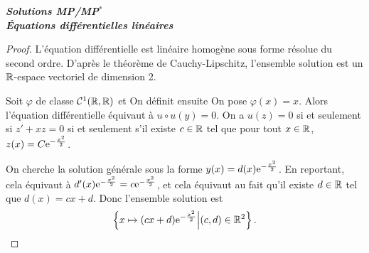 \documentclass[12pt]{article}
\begin{document}
\begin{titlepage}
	\centering
	\vspace*{\fill}
	\Huge \textit{\textbf{Solutions MP/MP$^*$\\ Équations différentielles linéaires}}
	\vspace*{\fill}
\end{titlepage}

\begin{proof}

	L'équation différentielle est linéaire homogène sous forme résolue du second ordre. D'après le théorème de Cauchy-Lipschitz, l'ensemble solution est un $\mathbb{R}$-espace vectoriel de dimension 2.

	Soit $\varphi$ de classe $\mathcal{C}^{1}(\mathbb{R},\mathbb{R})$ et 
	On définit ensuite 
	On pose $\varphi(x)=x$. Alors l'équation différentielle équivaut à $u\circ u(y)=0$. On a $u(z)=0$ si et seulement si $z'+xz=0$ si et seulement s'il existe $c\in\mathbb{R}$ tel que pour tout $x\in\mathbb{R}$, $z(x)=C\mathrm{e}^{-\frac{x^{2}}{2}}$.

	On cherche la solution générale sous la forme $y(x)=d(x)\mathrm{e}^{-\frac{x^{2}}{2}}$. En reportant, cela équivaut à $d'(x)\mathrm{e}^{-\frac{x^{2}}{2}}=c\mathrm{e}^{-\frac{x^{2}}{2}}$, et cela équivaut au fait qu'il existe $d\in\mathbb{R}$ tel que $d(x)=cx+d$.
	Donc l'ensemble solution est 
	\begin{equation*}
		\left\lbrace x\mapsto(cx+d)\mathrm{e}^{-\frac{x^{2}}{2}}\middle| (c,d)\in\mathbb{R}^{2}\right\rbrace.
	\end{equation*}
\end{proof}
\end{document}
